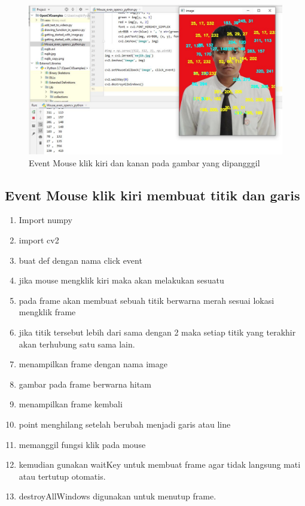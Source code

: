 \begin{figure}[ht]
\centering
\includegraphics[scale=0.5]{figures/2,22.jpg}
\caption{Event Mouse klik kiri dan kanan pada gambar yang dipangggil}
\label{contoh}
\end{figure}



\newpage
\subsection{Event Mouse klik kiri membuat titik dan garis}

\begin{enumerate}
	\item Import numpy
	\item import cv2
	\item buat def dengan nama click event
	\item jika mouse mengklik kiri maka akan melakukan sesuatu
	\item pada frame akan membuat sebuah titik berwarna merah sesuai lokasi mengklik frame
	\item jika titik tersebut lebih dari sama dengan 2 maka setiap titik yang terakhir akan terhubung satu sama lain.
	\item menampilkan frame dengan nama image
	\item gambar pada frame berwarna hitam
	\item menampilkan frame kembali
	\item point menghilang setelah berubah menjadi garis atau line
	\item memanggil fungsi klik pada mouse
	\item kemudian gunakan waitKey untuk membuat frame agar tidak langsung mati atau tertutup otomatis.
	\item destroyAllWindows digunakan untuk menutup frame.
\end{enumerate}

